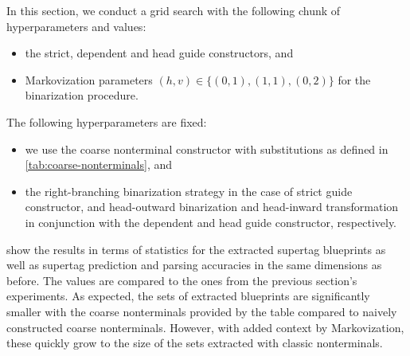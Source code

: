 \documentclass[../../document.tex]{subfiles}
\begin{document}
    In this section, we conduct a grid search with the following chunk of hyperparameters and values:
    \begin{itemize}
        \item the strict, dependent and head guide constructors, and
        \item Markovization parameters \((h,v) \in \{(0,1), (1,1), (0,2)\}\) for the binarization procedure.
    \end{itemize}
    The following hyperparameters are fixed:
    \begin{itemize}
        \item we use the coarse nonterminal constructor with substitutions as defined in \cref{tab:coarse-nonterminals}, and
        \item the right-branching binarization strategy in the case of strict guide constructor, and head-outward binarization and head-inward transformation in conjunction with the dependent and head guide constructor, respectively.
    \end{itemize}
     show the results in terms of statistics for the extracted supertag blueprints as well as supertag prediction and parsing accuracies in the same dimensions as before.
    The values are compared to the ones from the previous section's experiments.
    As expected, the sets of extracted blueprints are significantly smaller with the coarse nonterminals provided by the table compared to naively constructed coarse nonterminals.
    However, with added context by Markovization, these quickly grow to the size of the sets extracted with classic nonterminals.
\end{document}
